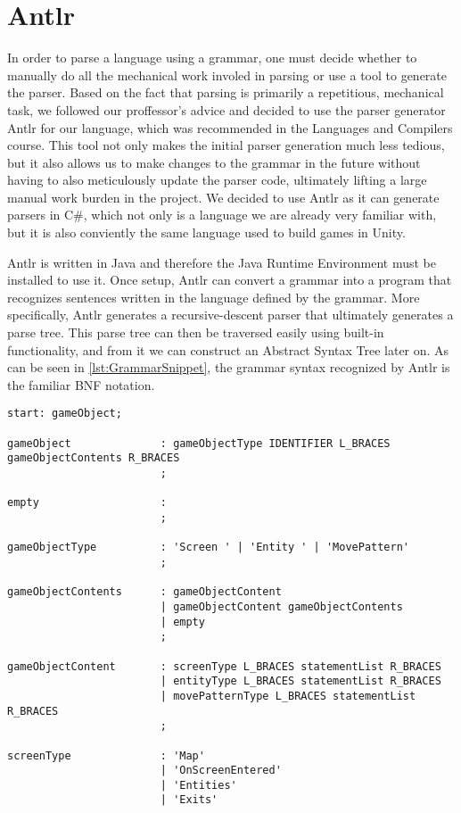 \section{Antlr}
In order to parse a language using a grammar, one must decide whether to manually do all the mechanical work involed in parsing or use a tool to generate the parser.
Based on the fact that parsing is primarily a repetitious, mechanical task, we followed our proffessor's advice and decided to use the parser generator Antlr for our language, which was recommended in the Languages and Compilers course. 
This tool not only makes the initial parser generation much less tedious, but it also allows us to make changes to the grammar in the future without having to also meticulously update the parser code, ultimately lifting a large manual work burden in the project.
We decided to use Antlr as it can generate parsers in C\#, which not only is a language we are already very familiar with, but it is also conviently the same language used to build games in Unity. \

Antlr is written in Java and therefore the Java Runtime Environment must be installed to use it. 
Once setup, Antlr can convert a grammar into a program that recognizes sentences written in the language defined by the grammar.
More specifically, Antlr generates a recursive-descent parser that ultimately generates a parse tree.
This parse tree can then be traversed easily using built-in functionality, and from it we can construct an Abstract Syntax Tree later on.
As can be seen in \ref{lst:GrammarSnippet}, the grammar syntax recognized by Antlr is the familiar BNF notation.

\begin{lstlisting}[caption={A snippet of the grammar used by Antlr to generate the parser}, label={lst:GrammarSnippet},escapechar=|]
start: gameObject;

gameObject              : gameObjectType IDENTIFIER L_BRACES gameObjectContents R_BRACES
                        ;

empty                   : 
                        ;

gameObjectType          : 'Screen ' | 'Entity ' | 'MovePattern' 
                        ;

gameObjectContents      : gameObjectContent
                        | gameObjectContent gameObjectContents
                        | empty
                        ;

gameObjectContent       : screenType L_BRACES statementList R_BRACES
                        | entityType L_BRACES statementList R_BRACES
                        | movePatternType L_BRACES statementList R_BRACES
                        ;

screenType              : 'Map'                 
                        | 'OnScreenEntered'
                        | 'Entities'
                        | 'Exits'

\end{lstlisting}
